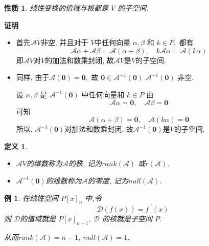 \documentclass[13pt]{beamer}
\newtheorem{exa}{例}
\newtheorem*{defi}{定义}
\newtheorem*{prop}{性质}
\def\pf{{\bf 证明~~ }}
\def\A{\mathscr{A}}
\def\0{\mathbf{0}}
\begin{document}
\begin{frame}
\begin{prop}
线性变换的值域与核都是 $V$ 的子空间.
\end{prop}
\pf 
\begin{itemize}
\item 
首先$\A V$非空, 并且对于 $V$中任何向量 $\alpha, \beta$ 和 ${k} \in {P},$ 都有
\[
\A \alpha+ \A \beta= \A(\alpha+\beta), \quad k \A \alpha=\A(k \alpha)
\]
即$\A V$对$V$的加法和数乘封闭, 故$\A V$是$V$的子空间. 

\item 同样, 由于$\A(\0) =\0,$ 故 $\0 \in {\A}^{-1}(\0)$ ${\A}^{-1}(\mathbf{0})$ 非空.

设 $\alpha, \beta$ 是 $\A^{-1}(\0)$ 中任何向量和 ${k} \in {P}$
由
\[
\A \alpha=\0, \quad \A \beta=\0
\]
可知
\[
\A (\alpha+\beta)=\0, \quad \A(k \alpha)=\0
\]
所以, $\A^{-1}(\0)$对加法和数乘封闭,  故$\A^{-1}(\0)$是$V$的子空间. 
\end{itemize}
\end{frame}

\begin{frame}
\begin{defi}
\begin{itemize}
\item $\A V$的维数称为$\A$的\alert{秩}, 记为$rank (\A)$ 或$r(\A)$. 

\item $\A^{-1}(\0)$的维数称为$\A$的\alert{零度}, 记为$null (\A)$.
\end{itemize}

\end{defi}

\begin{exa}
在线性空间 $P[x]_{n}$ 中,令
\[
\mathscr{D}(f(x))=f^{\,\, \prime}(x)
\]
则 $\mathscr{D}$的值域就是 $P[ x]_{n-1}$, $\mathscr{D}$ 的核就是子空间 $P$.

从而$rank (\A) =n-1$, $null (\A) = 1$.
\end{exa}
\end{frame}
\end{document}
